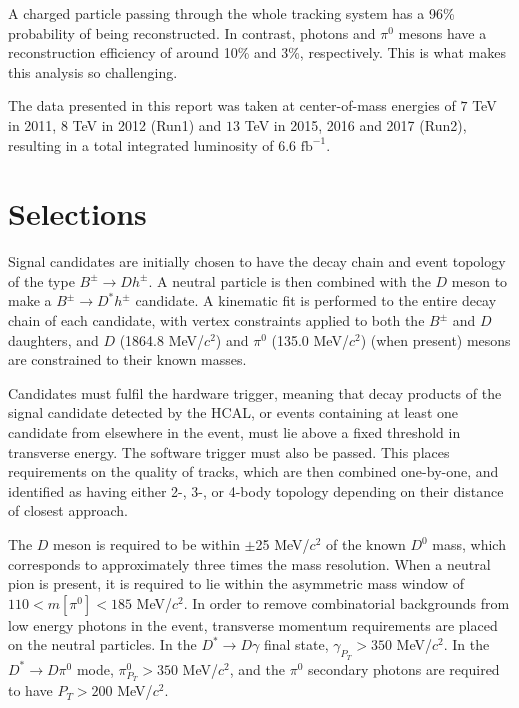 \documentclass[oneside,12pt]{article}
\begin{document}
A charged particle passing through the whole tracking system has a 96\%
probability of being reconstructed. In contrast, photons and $\pi^0$ mesons have a
reconstruction efficiency of around 10\% and 3\%, respectively. This is what
makes this analysis so challenging.

The data presented in this report was taken at center-of-mass energies of $7$
TeV in 2011, $8$ TeV in 2012 (Run1) and $13$ TeV in 2015, 2016 and 2017 (Run2),
resulting in a total integrated luminosity of $6.6$ $\text{fb}^{-1}$.

\section{Selections} \label{selections}

Signal candidates are initially chosen to have the decay chain and event
topology of the type $B^{\pm}\rightarrow Dh^{\pm}$. A neutral particle is then
combined with the $D$ meson to make a $B^{\pm}\rightarrow D^*h^{\pm}$ candidate.
A kinematic fit is performed to the entire decay chain of each candidate, with
vertex constraints applied to both the $B^{\pm}$ and $D$ daughters, and $D$
(1864.8 MeV/$c^2$) and $\pi^0$ (135.0 MeV/$c^2$) (when present) mesons are
constrained to their known masses.

Candidates must fulfil the hardware trigger, meaning that decay products of the
signal candidate detected by the HCAL, or events containing at least one
candidate from elsewhere in the event, must lie above a fixed threshold in
transverse energy.  The software trigger must also be passed. This places
requirements on the quality of tracks, which are then combined one-by-one, and
identified as having either 2-, 3-, or 4-body topology depending on their
distance of closest approach. 

The $D$ meson is required to be within $\pm$25 MeV/$c^2$ of the known $D^0$
mass, which corresponds to approximately three times the mass resolution.  When
a neutral pion is present, it is required to lie within the asymmetric mass
window of $110 < m[\pi^0] < 185$ MeV/$c^2$. In order to remove combinatorial
backgrounds from low energy photons in the event, transverse momentum
requirements are placed on the neutral particles. In the $D^*\rightarrow
D\gamma$ final state, $\gamma_{P_T}>350$ MeV/$c^2$. In the $D^*\rightarrow
D\pi^0$ mode, $\pi^0_{P_T}>350$ MeV/$c^2$, and the $\pi^0$ secondary photons are
required to have $P_T>200$ MeV/$c^2$.
\end{document}

